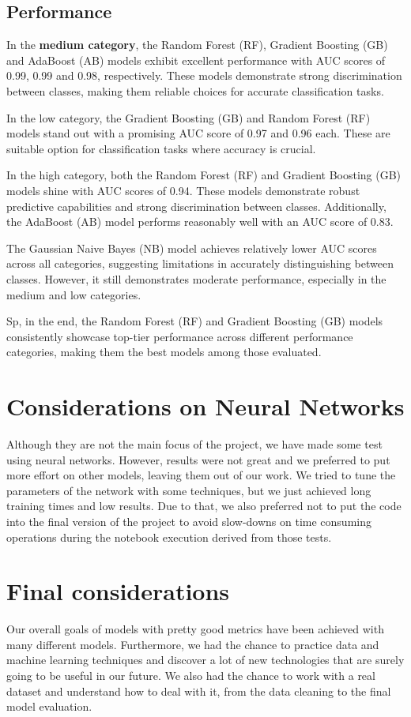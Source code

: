 \subsection{Performance}
In the \textbf{medium category}, the Random Forest (RF), Gradient Boosting (GB) and AdaBoost (AB) models exhibit excellent performance with AUC scores of 0.99, 0.99 and 0.98, respectively. These models demonstrate strong discrimination between classes, making them reliable choices for accurate classification tasks.

In the low category, the Gradient Boosting (GB) and Random Forest (RF) models stand out with a promising AUC score of 0.97 and 0.96 each. These are suitable option for classification tasks where accuracy is crucial.

In the high category, both the Random Forest (RF) and Gradient Boosting (GB) models shine with AUC scores of 0.94. These models demonstrate robust predictive capabilities and strong discrimination between classes. Additionally, the AdaBoost (AB) model performs reasonably well with an AUC score of 0.83.

The Gaussian Naive Bayes (NB) model achieves relatively lower AUC scores across all categories, suggesting limitations in accurately distinguishing between classes. However, it still demonstrates moderate performance, especially in the medium and low categories.

Sp, in the end, the Random Forest (RF) and Gradient Boosting (GB) models consistently showcase top-tier performance across different performance categories, making them the best models among those evaluated.

\section{Considerations on Neural Networks}
Although they are not the main focus of the project, we have made some test using neural networks. However, results were not great and we preferred to put more effort on other models, leaving them out of our work.
We tried to tune the parameters of the network with some techniques, but we just achieved long training times and low results.
Due to that, we also preferred not to put the code into the final version of the project to avoid slow-downs on time consuming operations during the notebook execution derived from those tests.
\section{Final considerations}
Our overall goals of models with pretty good metrics have been achieved with many different models. Furthermore, we had the chance to practice data and machine learning techniques and discover a lot of new technologies that are surely going to be useful in our future. We also had the chance to work with a real dataset and understand how to deal with it, from the data cleaning to the final model evaluation.